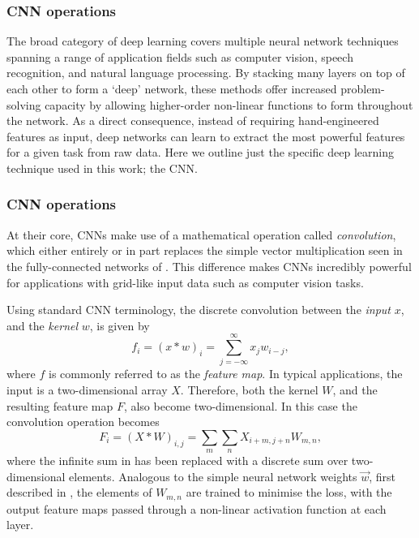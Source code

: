 \subsubsection*{CNN operations} %

The broad category of deep learning covers multiple neural network techniques spanning a range of
application fields such as computer vision, speech recognition, and natural language processing.
By stacking many layers on top of each other to form a `deep' network, these methods offer
increased problem-solving capacity by allowing higher-order non-linear functions to form
throughout the network. As a direct consequence, instead of requiring hand-engineered features as
input, deep networks can learn to extract the most powerful features for a given task from raw
data. Here we outline just the specific deep learning technique used in this work; the CNN.

\subsubsection*{CNN operations} %

At their core, CNNs make use of a mathematical operation called \emph{convolution}, which either
entirely or in part replaces the simple vector multiplication seen in the fully-connected networks
of . This difference makes CNNs incredibly powerful for
applications with grid-like input data such as computer vision tasks.

Using standard CNN terminology, the discrete convolution between the \emph{input} $x$, and the
\emph{kernel} $w$, is given by
\begin{equation}
    f_{i}=(x*w)_{i}=\sum^{\infty}_{j=-\infty}x_{j}w_{i-j},
    \label{eq:convolution}
\end{equation}
where $f$ is commonly referred to as the \emph{feature map}. In typical applications, the input is
a two-dimensional array $X$. Therefore, both the kernel $W$, and the resulting feature map $F$,
also become two-dimensional. In this case the convolution operation becomes
\begin{equation}
    F_{i}=(X*W)_{i,j}=\sum_{m}\sum_{n}X_{i+m,j+n}W_{m,n},
    \label{eq:conv}
\end{equation}
where the infinite sum in  has been replaced with a discrete sum over
two-dimensional elements. Analogous to the simple neural network weights $\vec{w}$, first
described in , the elements of $W_{m,n}$ are trained to minimise the loss,
with the output feature maps passed through a non-linear activation function at each layer.

